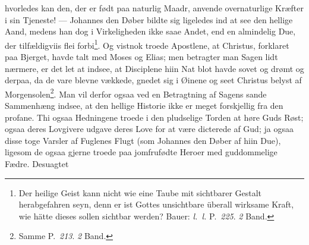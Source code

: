 \documentclass[12pt]{book}
\newcommand{\opage}[1]{\marginnote{\footnotesize\textit{[#1]}}}
\begin{document}
hvorledes kan den, der er født paa naturlig Maadr, anvende overnaturlige
Kræfter i sin Tjeneste! --- Johannes den Døber bildte sig ligeledes ind at see
den hellige Aand, medens han dog i Virkeligheden ikke saae Andet, end en
almindelig Due, der tilfældigviis flei
\opage{95} %
\setcounter{footnote}{0}%
forbi\footnote{Der heilige Geist kann nicht wie eine Taube mit sichtbarer
Gestalt herabgefahren seyn, denn er ist Gottes unsichtbare überall wirksame
Kraft, wie hätte dieses sollen sichtbar werden? Bauer: \textit{l.~l.}
P.~\textit{225}. \textit{2} Band.}. Og vistnok troede Apostlene, at Christus,
forklaret paa Bjerget, havde talt med Moses og Elias; men betragter man Sagen
lidt nærmere, er det let at indsee, at Disciplene hiin Nat blot havde sovet og
drømt og derpaa, da de vare blevne vækkede, gnedet sig i Øinene og seet
Christus belyst af Morgensolen\footnote{Samme P.~\textit{213}. \textit{2}
Band.}. Man vil derfor ogsaa ved en Betragtning af Sagens sande Sammenhæng
indsee, at den hellige Historie ikke er meget forskjellig fra den profane. Thi
ogsaa Hedningene troede i den pludselige Torden at høre Guds Røst; ogsaa deres
Lovgivere udgave deres Love for at være dicterede af Gud; ja ogsaa disse toge
Varsler af Fuglenes Flugt (som Johannes den Døber af hiin Due), ligesom de
ogsaa gjerne troede paa jomfrufødte Heroer med guddommelige Fædre. Desuagtet
\end{document}
